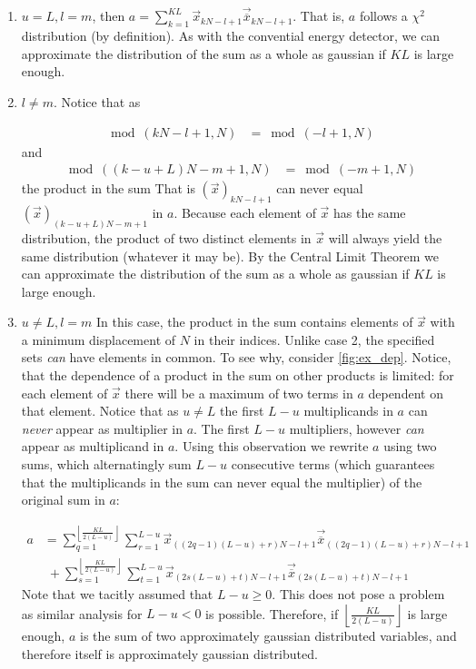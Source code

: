 \documentclass[a4paper, openany, oneside]{memoir}
\begin{document}
\begin{enumerate}
	\item $u=L, l=m$, then $a = \sum_{k=1}^{KL}\vec{x}_{kN-l+1}\vec{\overline{x}}_{kN-l+1}$. That is, $a$ follows a $\chi^2$ distribution (by definition). As with the convential energy detector, we can approximate the distribution of the sum as a whole as gaussian if $KL$ is large enough.
	\item $l \neq m$. Notice that as 

	\begin{align*}
	\bmod(kN-l+1,N) &= \bmod(-l+1, N)
	\end{align*}
	and
	\begin{align*}
	\bmod((k-u+L)N - m+1,N) &= \bmod(-m+1, N)
	\end{align*}
	the product in the sum
	That is $(\vec{x})_{kN-l+1}$  can never equal  $(\vec{x})_{(k-u+L)N - m+1}$ in $a$. Because each element of $\vec{x}$ has the same distribution, the product of two distinct elements in $\vec{x}$ will always yield the same distribution (whatever it may be). By the Central Limit Theorem we can approximate the distribution of the sum as a whole as gaussian if $KL$ is large enough.

	\item $u\neq L, l=m$ In this case, the product in the sum contains elements of $\vec{x}$ with a minimum displacement of $N$ in their indices. Unlike case 2, the specified sets \emph{can} have elements in common. To see why, consider \cref{fig:ex_dep}. Notice, that the dependence of a product in the sum on other products is limited: for each element of $\vec{x}$ there will be a maximum of two terms in $a$ dependent on that element. Notice that as $u\neq L$ the first $L-u$ multiplicands in $a$ can \emph{never} appear as multiplier in $a$. The first $L-u$ multipliers, however \emph{can} appear as multiplicand in $a$.  Using this observation we rewrite $a$ using two sums, which alternatingly sum $L-u$ consecutive terms (which guarantees that the multiplicands in the sum can never equal the multiplier) of the original sum in $a$: 

	\begin{align*}
	a &= \sum_{q=1}^{\left\lfloor{\frac{KL}{2(L-u)}}\right\rfloor} \sum_{r=1}^{L-u} \vec{x}_{((2q-1)(L-u)+r)N-l+1}\vec{\overline{x}}_{((2q-1)(L-u)+r)N-l+1} \\
	   & \;+ \sum_{s=1}^{\left\lfloor{\frac{KL}{2(L-u)}}\right\rfloor} \sum_{t=1}^{L-u} \vec{x}_{(2s(L-u)+t)N-l+1}\vec{\overline{x}}_{(2s(L-u)+t)N-l+1}
	\end{align*}
	Note that we tacitly assumed that $L-u \geq 0$. This does not pose a problem as similar analysis for $L-u < 0$ is possible. 
	Therefore, if $\left\lfloor{\frac{KL}{2(L-u)}}\right\rfloor$ is large enough, $a$ is the sum of two approximately gaussian distributed variables, and therefore itself is approximately gaussian distributed.			
\end{enumerate}
\end{document}
